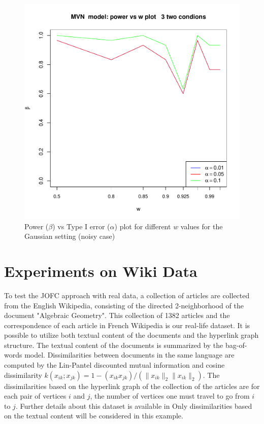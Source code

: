 \documentclass[11pt]{article} %
\begin{document}
 



\begin{figure}
\includegraphics[scale=0.95]{OOSMVN-power-w-c0-01-3-cond.pdf}
\caption{Power ($\beta$) vs Type I error ($\alpha$) plot for different $w$ values for the Gaussian setting (noisy case)}
\label{fig:MVN-c001-power-w-Kcond}
\end{figure}

\section{Experiments on Wiki Data}
To test the JOFC approach with real data, a collection of articles are collected from the English Wikipedia, consisting of the
 directed 2-neighborhood of the document "Algebraic Geometry". 
   This  collection of 1382 articles and the correspondence of each article in French 
Wikipedia is our real-life dataset. It is possible to utilize both textual content of the documents and the hyperlink graph structure. The textual content of the documents is summarized by the bag-of-words model. Dissimilarities between documents  in the same language are computed by the Lin-Pantel discounted mutual information \cite{LinPantel}
 and cosine dissimilarity $k(x_{ik}; x_{jk}) = 1 - (x_{ik} x_{jk})/(\|x_{ik}\|_2\|x_{ik}\|_2)$. 
 The dissimilarities based on the hyperlink graph of the collection of the articles are 
 for each pair of vertices $i$ and $j$, the number of vertices one must travel to go from $i$ to $j$.  Further details about this dataset is available in \cite{Zhiliang_disparate}     
Only  dissimilarities based on the textual content will be considered in this example.
   
\end{document}
